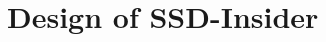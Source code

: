 \documentclass[conference]{IEEEtran}
\newcommand{\ours}{SSD-Insider}
\begin{document}

\section{Design of \ours{}}
\end{document}
